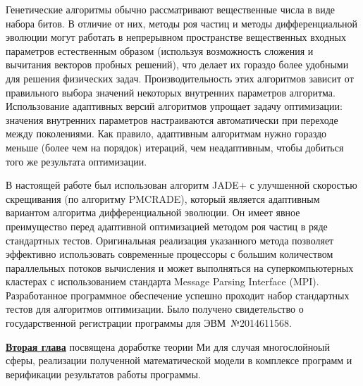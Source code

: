 Генетические алгоритмы обычно рассматривают вещественные числа в виде
набора битов. В отличие от них, методы роя частиц и методы
дифференциальной эволюции могут работать в непрерывном пространстве
вещественных входных параметров естественным образом (используя
возможность сложения и вычитания векторов пробных решений), что делает
их гораздо более удобными для решения физических
задач. Производительность этих алгоритмов зависит от правильного
выбора значений некоторых внутренних параметров
алгоритма. Использование адаптивных версий алгоритмов упрощает задачу
оптимизации: значения внутренних параметров настраиваются
автоматически при переходе между поколениями. Как правило, адаптивным
алгоритмам нужно гораздо меньше (более чем на порядок) итераций, чем
неадаптивным, чтобы добиться того же результата оптимизации.

В настоящей работе был использован алгоритм JADE+ с улучшенной
скоростью скрещивания (по алгоритму PMCRADE), который является
адаптивным вариантом алгоритма дифференциальной эволюции. Он имеет
явное преимущество перед адаптивной оптимизацией методом роя частиц в
ряде стандартных тестов.  Оригинальная реализация указанного метода
позволяет эффективно использовать современные процессоры с большим
количеством параллельных потоков вычисления и может выполняться на
суперкомпьютерных кластерах с использованием стандарта Message Parsing
Interface (MPI). Разработанное программное обеспечение успешно
проходит набор стандартных тестов для алгоритмов оптимизации. Было
получено свидетельство о государственной регистрации программы для
ЭВМ~№2014611568.

\underline{\textbf{Вторая глава}} посвящена доработке теории Ми для
случая многослойноый сферы, реализации полученной математической
модели в комплексе программ и верификации результатов работы
программы. 

